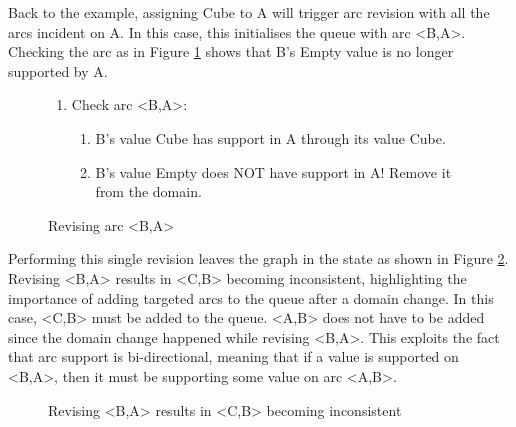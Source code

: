 Back to the example, assigning Cube to A will trigger arc revision with all the arcs incident on A. In this case, this initialises the queue with arc <B,A>. Checking the arc as in Figure \ref{fig:arcRevision} shows that B's Empty value is no longer supported by A.

\begin{figure}[H]
    \begin{framed}
        \begin{enumerate}
            \item Check arc <B,A>:
                  \begin{enumerate}
                      \item B's value Cube has support in A through its value Cube.
                      \item B's value Empty does NOT have support in A! Remove it from the domain.
                  \end{enumerate}
        \end{enumerate}
    \end{framed}
    \caption{Revising arc <B,A>}
    \label{fig:arcRevision}
\end{figure}

Performing this single revision leaves the graph in the state as shown in Figure \ref{fig:arcsRevised1}. Revising <B,A> results in <C,B> becoming inconsistent, highlighting the importance of adding targeted arcs to the queue after a domain change. In this case, <C,B> must be added to the queue. <A,B> does not have to be added since the domain change happened while revising <B,A>. This exploits the fact that arc support is bi-directional, meaning that if a value is supported on <B,A>, then it must be supporting some value on arc <A,B>.

\begin{figure}[H]
    \centering

    \caption{Revising <B,A> results in <C,B> becoming inconsistent}
    \label{fig:arcsRevised1}
\end{figure}

